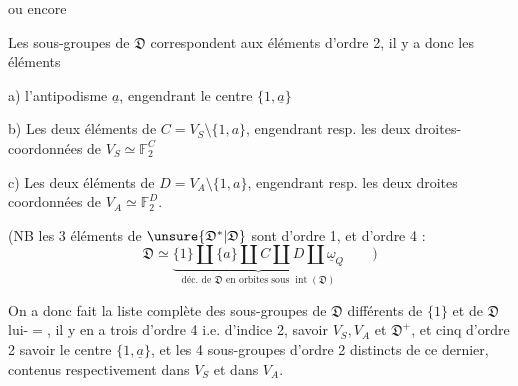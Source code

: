 ou encore 

Les sous-groupes  de $\mathfrak{D}$ correspondent aux
éléments d'ordre 2, il y a donc les éléments

a) l'antipodisme $\underline{a}$, engendrant le centre $\{1,\underline{a}\}$

b) Les deux éléments de $C=V_S\setminus\{1,a\}$, engendrant resp. les deux
droites-coordonnées de $V_S\simeq\mathbb{F}_2^C$

c) Les deux éléments de $D=V_A\setminus\{1,a\}$, engendrant resp. les deux
droites coordonnées de $V_A\simeq\mathbb{F}_2^D$.


(NB les  3 éléments de
$\unsure{\mathfrak{D}^*|\mathfrak{D}}$ sont d'ordre 1, et d'ordre 4 :
\[
\mathfrak{D}\simeq
\underbrace{\{1\}\amalg\{a\}\amalg C\amalg D\amalg\underline{\omega}_Q}
_{\text{déc. de }\mathfrak{D}\text{ en orbites sous }\operatorname{int}(\mathfrak{D})}
\qquad)
\]

On a donc fait la liste complète des sous-groupes de $\mathfrak{D}$ différents
de $\{1\}$ et de $\mathfrak{D}$ lui-$=$, il y en a trois d'ordre 4 i.e.
d'indice 2, savoir $V_S,V_A$ et $\mathfrak{D}^+$,
et cinq d'ordre 2 savoir le centre $\{1,\underline{a}\}$,
et les 4 sous-groupes  d'ordre 2 distincts de ce dernier,
contenus respectivement dans $V_S$ et dans $V_A$.

